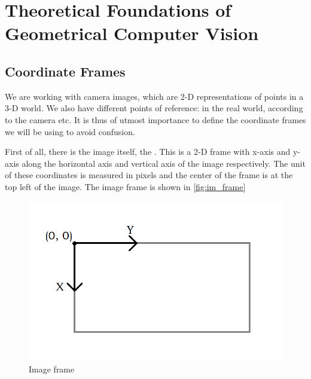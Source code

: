 \chapter{Theoretical Foundations of Geometrical Computer Vision}\label{chap:theoretic_found}


\section{Coordinate Frames}\label{sec:coord_frames}
We are working with camera images, which are 2-D representations of points in a 3-D world. We also have different points of reference: in the real world, according to the camera etc. It is thus of utmost importance to define the coordinate frames we will be using to avoid confusion.\bigskip

First of all, there is the image itself, the . This is a 2-D frame with x-axis and y-axis along the horizontal axis and vertical axis of the image respectively. The unit of these coordinates is measured in pixels and the center of the frame is at the top left of the image. The image frame is shown in \autoref{fig:im_frame}\bigskip

\begin{figure}
    \centering
    \includegraphics[width=1\textwidth]{figures/image_frame.png}
    \caption{Image frame}
    \label{fig:im_frame}
\end{figure}

